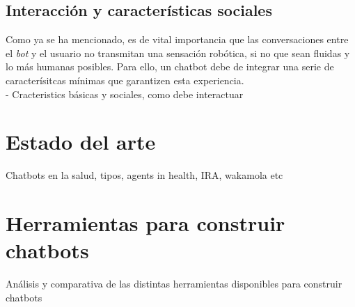 \subsection{Interacción y características sociales}
Como ya se ha mencionado, es de vital importancia que las conversaciones entre el \textit{bot} y el usuario no transmitan una sensación robótica, si no que sean fluidas y lo más humanas posibles. Para ello, un chatbot debe de integrar una serie de caracterísitcas mínimas que garantizen esta experiencia.\\

- Cracteristics básicas y sociales, como debe interactuar

\section{Estado del arte}
Chatbots en la salud, tipos, agents in health, IRA, wakamola etc\\


\section{Herramientas para construir chatbots}
Análisis y comparativa de las distintas herramientas disponibles para construir chatbots

